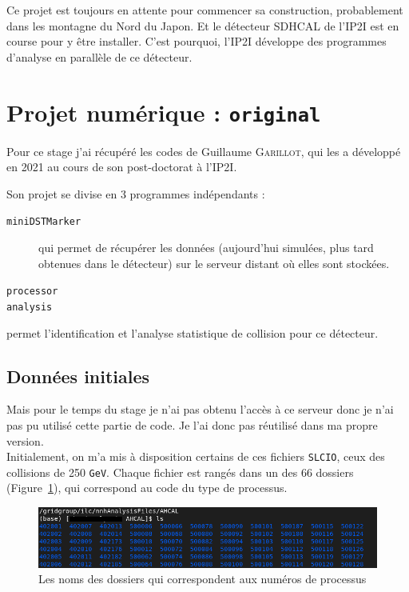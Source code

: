 \documentclass[10pt,a4paper]{report}
\newcommand{\SLCIO}{\texttt{SLCIO}\xspace}
\newcommand{\original}{\texttt{original}\xspace}
\newcommand{\GeV}{\texttt{GeV}}
\begin{document}
Ce projet est toujours en attente pour commencer sa construction, probablement dans les montagne du Nord du Japon. Et le détecteur SDHCAL de l'IP2I est en course pour y être installer. C'est pourquoi, l'IP2I développe des programmes d'analyse en parallèle de ce détecteur.

\section{Projet numérique : \original}

Pour ce stage j'ai récupéré les codes de Guillaume \textsc{Garillot}, qui les a développé en 2021 au cours de son post-doctorat à l'IP2I. 

Son projet se divise en 3 programmes indépendants :

\begin{description}
	
	\item[\texttt{miniDSTMarker}] qui permet de récupérer les données (aujourd'hui simulées, plus tard obtenues dans le détecteur) sur le serveur distant où elles sont stockées.
	
	\item[\texttt{processor}]
	
	\item[\texttt{analysis}]
	
\end{description} 

permet l'identification et l'analyse statistique de collision pour ce détecteur.

\subsection{Données initiales}


Mais pour le temps du stage je n'ai pas obtenu l'accès à ce serveur donc je n'ai pas pu utilisé cette partie de code. Je l'ai donc pas réutilisé dans ma propre version.\\

Initialement, on m'a mis à disposition certains de ces fichiers \SLCIO, ceux des collisions de 250 \GeV. 
Chaque fichier est rangés dans un des 66 dossiers (Figure~\ref{data:list}), qui correspond au code du type de processus.

\begin{figure}[h!]
	\includegraphics[width=\textwidth]{../img/listeProcessus.png} 
	\caption{Les noms des dossiers qui correspondent aux numéros de processus}
	\label{data:list}
\end{figure}
\end{document}
